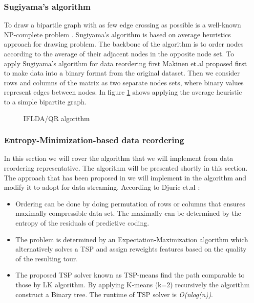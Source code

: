 \subsubsection{Sugiyama's algorithm}
To draw a bipartile graph with as few edge crossing as possible is a well-known NP-complete problem \cite{p312}. Sugiyama's algorithm is based on average heuristics approach for drawing problem. The backbone of the algorithm is to order nodes according to the average of their adjacent nodes in the opposite node set. To apply Sugiyama's algorithm for data reordering first Makinen et.al proposed first to make data into a binary format from the original dataset. Then we consider rows and columns of the matrix as two separate nodes sets, where binary values represent edges between nodes. In figure \ref{fig: Sugiyama's algorithm} shows applying the average heuristic to a simple bipartite graph.
\begin{figure}[htbp]
	\centering
	
	
	\caption{IFLDA/QR algorithm }
	\label{fig: Sugiyama's algorithm}
\end{figure}
\subsubsection{Entropy-Minimization-based data reordering}
In this section we will cover the algorithm that we will implement from data reordering representative. The algorithm will be presented shortly in this section. The approach that has been proposed in \cite{1thesis3} we will implement in the algorithm and modify it to adopt for data streaming. According to Djuric et.al \cite{1thesis3}:
\begin{itemize}
	\item Ordering can be done by doing permutation of rows or columns that ensures maximally compressible data set. The maximally can be determined by the entropy of the residuals of predictive coding.
	\item The problem is determined by an Expectation-Maximization algorithm which alternatively solves a TSP and assign reweights features based on the quality of the resulting tour.
	\item The proposed TSP solver known as TSP-means find the path comparable to those by LK algorithm. By applying K-means (k=2) recursively the algorithm construct a Binary tree. The runtime of TSP solver is \textit{O(nlog(n))}.
\end{itemize}

